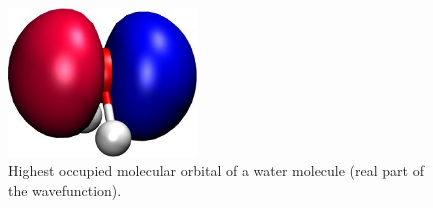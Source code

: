 \begin{figure}
  \centering
  \includegraphics[width=5cm]{figures/h2o-homo-real.jpg}
  \caption{Highest occupied molecular orbital of a water molecule (real part of
    the wavefunction).}
  \label{fig:h2o-homo-real}
\end{figure}





